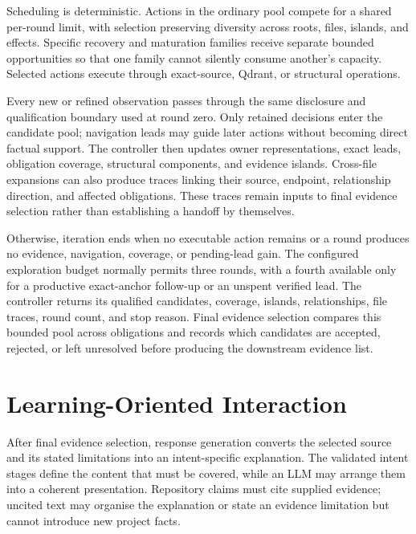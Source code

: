 Scheduling is deterministic. Actions in the ordinary pool compete for a shared per-round limit, with selection preserving diversity across roots, files, islands, and effects. Specific recovery and maturation families receive separate bounded opportunities so that one family cannot silently consume another's capacity. Selected actions execute through exact-source, Qdrant, or structural operations.

Every new or refined observation passes through the same disclosure and qualification boundary used at round zero. Only retained decisions enter the candidate pool; navigation leads may guide later actions without becoming direct factual support. The controller then updates owner representations, exact leads, obligation coverage, structural components, and evidence islands. Cross-file expansions can also produce traces linking their source, endpoint, relationship direction, and affected obligations. These traces remain inputs to final evidence selection rather than establishing a handoff by themselves.

Otherwise, iteration ends when no executable action remains or a round produces no evidence, navigation, coverage, or pending-lead gain. The configured exploration budget normally permits three rounds, with a fourth available only for a productive exact-anchor follow-up or an unspent verified lead. The controller returns its qualified candidates, coverage, islands, relationships, file traces, round count, and stop reason. Final evidence selection compares this bounded pool across obligations and records which candidates are accepted, rejected, or left unresolved before producing the downstream evidence list.

\section{Learning-Oriented Interaction}\label{sec:learning-oriented-interaction}

After final evidence selection, response generation converts the selected source and its stated limitations into an intent-specific explanation. The validated intent stages define the content that must be covered, while an LLM may arrange them into a coherent presentation. Repository claims must cite supplied evidence; uncited text may organise the explanation or state an evidence limitation but cannot introduce new project facts.

